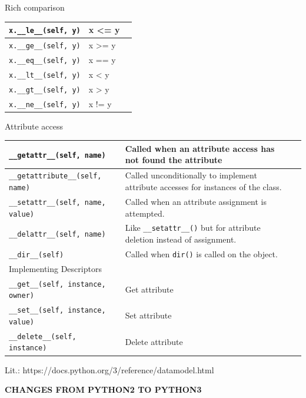 \documentclass[9pt,a4wide]{extarticle}
\begin{document}
\bigskip

Rich comparison

\begin{supertabular}{|l|p{12.5cm}|c|}\hline
{\tt x.\_\_le\_\_(self, y)}  &  x <= y    \\ \hline
{\tt x.\_\_ge\_\_(self, y)}  &  x >= y    \\ \hline
{\tt x.\_\_eq\_\_(self, y)}  &  x == y    \\ \hline
{\tt x.\_\_lt\_\_(self, y)}  &  x < y     \\ \hline
{\tt x.\_\_gt\_\_(self, y)}  &  x > y     \\ \hline
{\tt x.\_\_ne\_\_(self, y)}  &  x != y    \\ \hline
\end{supertabular}

\bigskip

Attribute access

\begin{supertabular}{|l|p{12cm}|c|}\hline
{\tt \_\_getattr\_\_(self, name)}  & Called when an attribute access has not found the attribute      \\ \hline
{\tt \_\_getattribute\_\_(self, name)}  &  Called unconditionally to implement attribute accesses for instances of the class.      \\ \hline
{\tt \_\_setattr\_\_(self, name, value)}  &  Called when an attribute assignment is attempted.      \\ \hline
{\tt \_\_delattr\_\_(self, name)}  & Like {\tt \_\_setattr\_\_()} but for attribute deletion instead of assignment.       \\ \hline
{\tt \_\_dir\_\_(self)}  & Called when {\tt dir()} is called on the object.  \\ \hline\hline
Implementing Descriptors &   \\ \hline
{\tt \_\_get\_\_(self, instance, owner)}  & Get attribute      \\ \hline
{\tt \_\_set\_\_(self, instance, value)}  & Set attribute      \\ \hline
{\tt \_\_delete\_\_(self, instance)}  & Delete attribute      \\ \hline
\end{supertabular}



Lit.: https://docs.python.org/3/reference/datamodel.html


\bigskip
{\LARGE\bf CHANGES FROM PYTHON2 TO PYTHON3}
\end{document}
